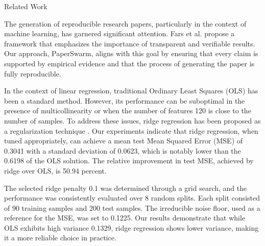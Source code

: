Related Work

The generation of reproducible research papers, particularly in the context of machine learning, has garnered significant attention. Fars et al. \citep{fars2026} propose a framework that emphasizes the importance of transparent and verifiable results. Our approach, PaperSwarm, aligns with this goal by ensuring that every claim is supported by empirical evidence and that the process of generating the paper is fully reproducible.

In the context of linear regression, traditional Ordinary Least Squares (OLS) \citep{hoerl1970ridge} has been a standard method. However, its performance can be suboptimal in the presence of multicollinearity or when the number of features 120 is close to the number of samples. To address these issues, ridge regression has been proposed as a regularization technique \citep{hoerl1970ridge}. Our experiments indicate that ridge regression, when tuned appropriately, can achieve a mean test Mean Squared Error (MSE) of 0.3041 with a standard deviation of 0.0623, which is notably lower than the 0.6198 of the OLS solution. The relative improvement in test MSE, achieved by ridge over OLS, is 50.94 percent.

The selected ridge penalty 0.1 was determined through a grid search, and the performance was consistently evaluated over 8 random splits. Each split consisted of 90 training samples and 200 test samples. The irreducible noise floor, used as a reference for the MSE, was set to 0.1225. Our results demonstrate that while OLS exhibits high variance 0.1329, ridge regression shows lower variance, making it a more reliable choice in practice.
